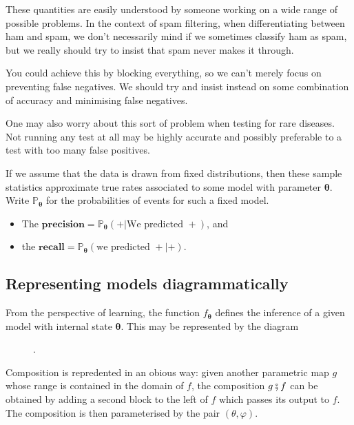 \documentclass[10pt,a4paper]{article}
\begin{document}
These quantities are easily understood by someone working on a wide range of possible problems.
In the context of spam filtering, when differentiating between ham and spam, we don't necessarily mind if we sometimes classify ham as spam, but we really should try to insist that spam never makes it through.

You could achieve this by blocking everything, so we can't merely focus on preventing false negatives.
We should try and insist instead on some combination of accuracy and minimising false negatives.

One may also worry about this sort of problem when testing for rare diseases.
Not running any test at all may be highly accurate and possibly preferable to a test with too many false positives.

If we assume that the data is drawn from fixed distributions, then these sample statistics approximate true rates associated to some model with parameter $\boldsymbol\theta$.
Write $\mathbb P_{\boldsymbol\theta}$ for the probabilities of events for such a fixed model.
\begin{itemize}
\item The $\textbf{precision}=\mathbb P_{\boldsymbol\theta}(+|\text{We predicted }+)$, and
\item the $\textbf{recall}=\mathbb P_{\boldsymbol\theta}(\text{we predicted }+|+)$.
\end{itemize}
\subsection{Representing models diagrammatically}
From the perspective of learning, the function $f_{\boldsymbol\theta}$ defines the inference of a given model with internal state $\boldsymbol\theta$.
This may be represented by the diagram
\begin{figure}[H]
\centering
{}.
\end{figure}
Composition is repredented in an obious way: given another parametric map $g$ whose range is contained in the domain of $f$, the composition $g\fatsemi f$ can be obtained by adding a second block to the left of $f$ which passes its output to $f$.
The composition is then parameterised by the pair $(\theta,\varphi)$.
\end{document}
